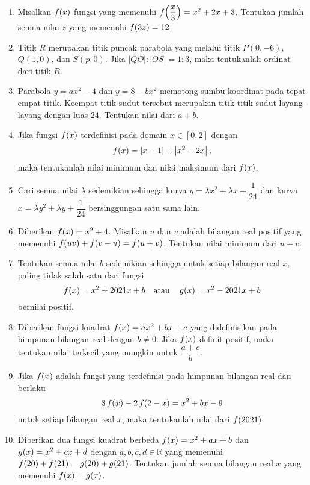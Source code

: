 		\begin{enumerate}[topsep=0pt]
			\item Misalkan $ \mathop{}\!{f}{\left({x}\right)} $ fungsi yang memenuhi $ \mathop{}\!{f}{\left({\dfrac{x}{3}}\right)} = x^{2} + 2x + 3 $. Tentukan jumlah semua nilai $ z $ yang memenuhi $ \mathop{}\!{f}{\left({3z}\right)} = 12 $.
			\item Titik $ R $ merupakan titik puncak parabola yang melalui titik $ P\left(0, -6\right) $, $ Q\left(1, 0\right) $, dan $ S\left(p, 0\right) $. Jika $ \left|QO\right| : \left|OS\right| = 1 : 3 $, maka tentukanlah ordinat dari titik $ R $.
			\item Parabola $ y = ax^{2} - 4 $ dan $ y = 8 - bx^{2} $ memotong sumbu koordinat pada tepat empat titik. Keempat titik sudut tersebut merupakan titik-titik sudut layang-layang dengan luas 24. Tentukan nilai dari $ a + b $.
			\item Jika fungsi $ \mathop{}\!{f}{\left({x}\right)} $ terdefinisi pada domain $ x \in \left[0, 2\right] $ dengan
			\[ \mathop{}\!{f}{\left({x}\right)} = \left|x - 1\right| + \left|x^{2} - 2x\right|, \]
			maka tentukanlah nilai minimum dan nilai maksimum dari $ \mathop{}\!{f}{\left({x}\right)} $.
			\item Cari semua nilai $ \lambda $ sedemikian sehingga kurva $ y = \lambda x^{2} + \lambda x + \dfrac{1}{24} $ dan kurva $ x = \lambda y^{2} + \lambda y + \dfrac{1}{24} $ bersinggungan satu sama lain.
			\item Diberikan $ \mathop{}\!{f}{\left({x}\right)} = x^{2} + 4 $. Misalkan $ u $ dan $ v $ adalah bilangan real positif yang memenuhi $ \mathop{}\!{f}{\left({uv}\right)} + \mathop{}\!{f}{\left({v - u}\right)} = \mathop{}\!{f}{\left({u + v}\right)} $. Tentukan nilai minimum dari $ u + v $.
			\item Tentukan semua nilai $ b $ sedemikian sehingga untuk setiap bilangan real $ x $, paling tidak salah satu dari fungsi
			\[ \mathop{}\!{f}{\left({x}\right)} = x^{2} + 2021x + b \quad \mbox{atau} \quad \mathop{}\!{g}{\left({x}\right)} = x^{2} - 2021x + b \]
			bernilai positif.
			\item Diberikan fungsi kuadrat $ \mathop{}\!{f}{\left({x}\right)} = ax^{2} + bx + c $ yang didefinisikan pada himpunan bilangan real dengan $ b \ne 0 $. Jika $ \mathop{}\!{f}{\left({x}\right)} $ definit positif, maka tentukan nilai terkecil yang mungkin untuk $ \dfrac{a + c}{b} $.
			\item Jika $ \mathop{}\!{f}{\left({x}\right)} $ adalah fungsi yang terdefinisi pada himpunan bilangan real dan berlaku
			\[ 3\mathop{}\!{f}{\left({x}\right)} - 2\mathop{}\!{f}{\left({2 - x}\right)} = x^{2} + bx - 9 \]
			untuk setiap bilangan real $ x $, maka tentukanlah nilai dari $ \mathop{}\!{f}{\left({2021}\right)} $.
			\item Diberikan dua fungsi kuadrat berbeda $ \mathop{}\!{f}{\left({x}\right)} = x^{2} + ax + b $ dan $ \mathop{}\!{g}{\left({x}\right)} = x^{2} + cx + d $ dengan $ a, b, c, d \in \mathbb{R} $ yang memenuhi $ \mathop{}\!{f}{\left({20}\right)} + \mathop{}\!{f}{\left({21}\right)} = \mathop{}\!{g}{\left({20}\right)} + \mathop{}\!{g}{\left({21}\right)} $. Tentukan jumlah semua bilangan real $ x $ yang memenuhi $ \mathop{}\!{f}{\left({x}\right)} = \mathop{}\!{g}{\left({x}\right)} $.

\end{enumerate}
